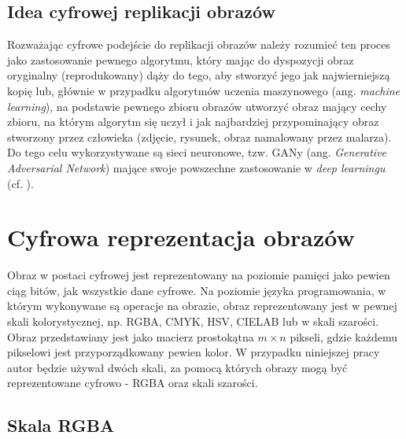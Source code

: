 \subsection{Idea cyfrowej replikacji obrazów}
\label{subsec:idea_of_dip}
Rozważając cyfrowe podejście do replikacji obrazów należy rozumieć ten proces jako zastosowanie pewnego algorytmu, który mając do dyspozycji obraz oryginalny (reprodukowany) dąży do tego, aby stworzyć jego jak najwierniejszą kopię lub, głównie w przypadku algorytmów uczenia maszynowego (ang. \textit{machine learning}), na podstawie pewnego zbioru obrazów utworzyć obraz mający cechy zbioru, na którym algorytm się uczył i jak najbardziej przypominający obraz stworzony przez człowieka (zdjęcie, rysunek, obraz namalowany przez malarza). Do tego celu wykorzystywane są sieci neuronowe, tzw. GANy (ang. \textit{Generative Adversarial Network}) mające swoje powszechne zastosowanie w \textit{deep learningu} (cf. \cite{GANS}).

\section{Cyfrowa reprezentacja obrazów}

Obraz w postaci cyfrowej jest reprezentowany na poziomie pamięci jako pewien ciąg bitów, jak wszystkie dane cyfrowe. Na poziomie języka programowania, w którym wykonywane są operacje na obrazie, obraz reprezentowany jest w pewnej skali kolorystycznej, np. RGBA, CMYK, HSV, CIELAB lub w skali szarości. Obraz przedstawiany jest jako macierz prostokątna $m \times n$ pikseli, gdzie każdemu pikselowi jest przyporządkowany pewien kolor. W przypadku niniejszej pracy autor będzie używał dwóch skali, za pomocą których obrazy mogą być reprezentowane cyfrowo - RGBA oraz skali szarości.

\subsection{Skala RGBA}
\label{subsec:rgba}

